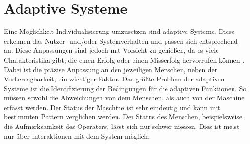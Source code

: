 \section{Adaptive Systeme}
\label{2:Adaptive-Systeme}
Eine Möglichkeit Individualisierung umzusetzen sind adaptive Systeme. Diese erkennen das Nutzer- und/oder Systemverhalten und passen sich entsprechend an. Diese Anpassungen sind jedoch mit Vorsicht zu genießen, da es viele Charakteristika gibt, die einen Erfolg oder einen Misserfolg hervorrufen können \cite{Gajos2008}. Dabei ist die präzise Anpassung an den jeweiligen Menschen, neben der Vorhersagbarkeit, ein wichtiger Faktor. \cite{Gajos2008} Das größte Problem der adaptiven Systeme ist die Identifizierung der Bedingungen für die adaptiven Funktionen. So müssen sowohl die Abweichungen von dem Menschen, als auch von der Maschine erfasst werden. Der Status der Maschine ist sehr eindeutig und kann mit bestimmten Pattern verglichen werden. Der Status des Menschen, beispielsweise die Aufmerksamkeit des Operators, lässt sich nur schwer messen. Dies ist meist nur über Interaktionen mit dem System möglich. \cite{Viano2000}

